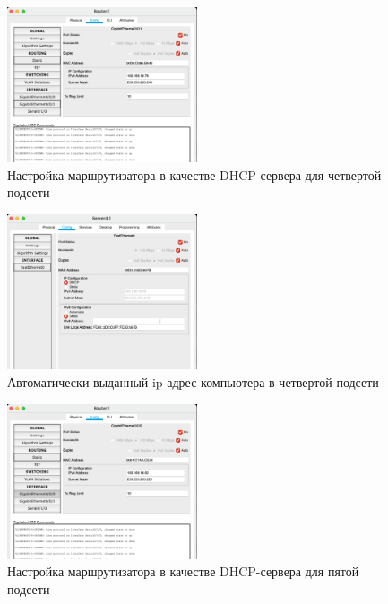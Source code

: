 \begin{figure}[H]
    \centering
    \includegraphics[width=0.5\textwidth]{img/content/DHCP_4.png}
    \caption{Настройка маршрутизатора в качестве DHCP-сервера для четвертой подсети}
\end{figure}

\begin{figure}[H]
    \centering
    \includegraphics[width=0.5\textwidth]{img/content/PC_4.png}
    \caption{Автоматически выданный ip-адрес компьютера в четвертой подсети}
\end{figure}

\begin{figure}[H]
    \centering
    \includegraphics[width=0.5\textwidth]{img/content/DHCP_5.png}
    \caption{Настройка маршрутизатора в качестве DHCP-сервера для пятой подсети}
\end{figure}

